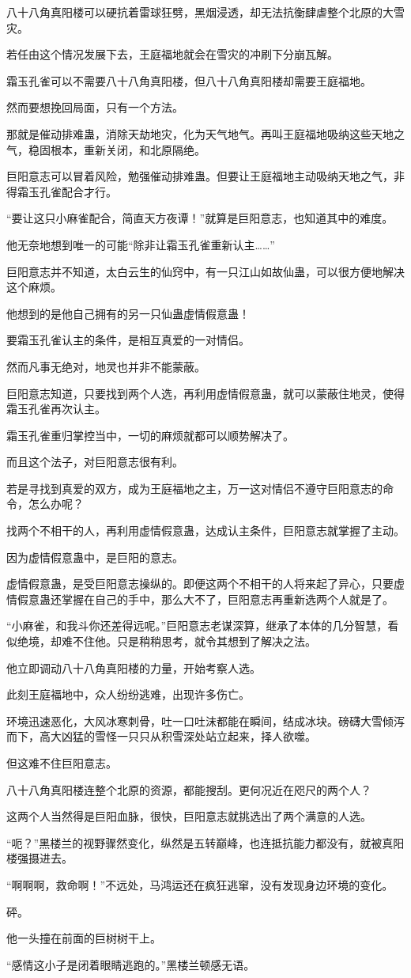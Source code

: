 \begin{this_body}
八十八角真阳楼可以硬抗着雷球狂劈，黑烟浸透，却无法抗衡肆虐整个北原的大雪灾。

若任由这个情况发展下去，王庭福地就会在雪灾的冲刷下分崩瓦解。

霜玉孔雀可以不需要八十八角真阳楼，但八十八角真阳楼却需要王庭福地。

然而要想挽回局面，只有一个方法。

那就是催动排难蛊，消除天劫地灾，化为天气地气。再叫王庭福地吸纳这些天地之气，稳固根本，重新关闭，和北原隔绝。

巨阳意志可以冒着风险，勉强催动排难蛊。但要让王庭福地主动吸纳天地之气，非得霜玉孔雀配合才行。

“要让这只小麻雀配合，简直天方夜谭！”就算是巨阳意志，也知道其中的难度。

他无奈地想到唯一的可能“除非让霜玉孔雀重新认主……”

巨阳意志并不知道，太白云生的仙窍中，有一只江山如故仙蛊，可以很方便地解决这个麻烦。

他想到的是他自己拥有的另一只仙蛊虚情假意蛊！

要霜玉孔雀认主的条件，是相互真爱的一对情侣。

然而凡事无绝对，地灵也并非不能蒙蔽。

巨阳意志知道，只要找到两个人选，再利用虚情假意蛊，就可以蒙蔽住地灵，使得霜玉孔雀再次认主。

霜玉孔雀重归掌控当中，一切的麻烦就都可以顺势解决了。

而且这个法子，对巨阳意志很有利。

若是寻找到真爱的双方，成为王庭福地之主，万一这对情侣不遵守巨阳意志的命令，怎么办呢？

找两个不相干的人，再利用虚情假意蛊，达成认主条件，巨阳意志就掌握了主动。

因为虚情假意蛊中，是巨阳的意志。

虚情假意蛊，是受巨阳意志操纵的。即便这两个不相干的人将来起了异心，只要虚情假意蛊还掌握在自己的手中，那么大不了，巨阳意志再重新选两个人就是了。

“小麻雀，和我斗你还差得远呢。”巨阳意志老谋深算，继承了本体的几分智慧，看似绝境，却难不住他。只是稍稍思考，就令其想到了解决之法。

他立即调动八十八角真阳楼的力量，开始考察人选。

此刻王庭福地中，众人纷纷逃难，出现许多伤亡。

环境迅速恶化，大风冰寒刺骨，吐一口吐沫都能在瞬间，结成冰块。磅礴大雪倾泻而下，高大凶猛的雪怪一只只从积雪深处站立起来，择人欲噬。

但这难不住巨阳意志。

八十八角真阳楼连整个北原的资源，都能搜刮。更何况近在咫尺的两个人？

这两个人当然得是巨阳血脉，很快，巨阳意志就挑选出了两个满意的人选。

“呃？”黑楼兰的视野骤然变化，纵然是五转巅峰，也连抵抗能力都没有，就被真阳楼强摄进去。

“啊啊啊，救命啊！”不远处，马鸿运还在疯狂逃窜，没有发现身边环境的变化。

砰。

他一头撞在前面的巨树树干上。

“感情这小子是闭着眼睛逃跑的。”黑楼兰顿感无语。

\end{this_body}

